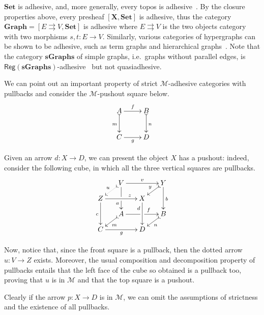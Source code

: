 \documentclass[runningheads,envcountsect]{lipics-v2021}
\newcommand{\cat}[1]{\ensuremath{\mathbf{#1}}}
\def\C{\textbf {\textup{C}}}
\newcommand{\reg}{\mathsf{Reg}}
\begin{document}
\begin{example}
	\label{ex:adhesive}
	$\cat{Set}$ is adhesive, and, more generally, every topos is
	adhesive~\cite{lack2006toposes}. By the closure properties above, every presheaf $[\cat{X},\cat{Set}]$ is adhesive, thus the category
	$\cat{Graph} = [ E \rightrightarrows V, \cat{Set}]$ is adhesive
	where $E \rightrightarrows {V}$ is the two objects category with two
	morphisms $s,t \colon{E} \to {V}$. Similarly, various
	categories of hypergraphs can be shown to be adhesive, such as term
	graphs and hierarchical graphs~\cite{CastelnovoGM24}. Note that the category $\cat{sGraphs}$ of simple graphs, 
	i.e.~graphs without parallel edges, is
	$\reg{(\cat{sGraphs})}$-adhesive~\cite{BehrHK23} but not
	quasiadhesive.
\end{example}


\begin{remark}\label{rem:deco}
	We can point out an important property of strict $\mathcal{M}$-adhesive categories with pullbacks and consider the $\mathcal{M}$-pushout square below.
	\[\xymatrix{A \ar[r]^{f} \ar@{>->}[d]_{m}& B \ar@{>->}[d]^{n}\\ C \ar[r]_{g} & D}\]
	
	Given an arrow $d\colon X\to D$, we can present the object $X$ has a pushout: indeed, consider the following cube, in which all the three vertical squares are pullbacks.
	\[
	\xymatrix@C=15pt@R=9pt{&V\ar[dd]|\hole_(.65){a}\ar[rr]^{v} \ar@{>.>}[dl]_{u} && Y \ar[dd]^{b} \ar@{>->}[dl]_{y} \\ Z  \ar[dd]_{c}\ar[rr]^(.7){z} & & X \ar[dd]_(.3){d}\\&A\ar[rr]|\hole^(.65){f} \ar@{>->}[dl]^{m} && B \ar@{>->}[dl]^{n} \\C \ar[rr]_{g} & & D }\]

Now, notice that, since the front square is a pullback, then the dotted arrow $u\colon V\to Z$ exists. Moreover, the usual composition and decomposition property of pullbacks \cite{mac2013categories} entails that the left face of the cube so obtained is a pullback too, proving that $u$ is in $\mathcal{M}$ and that the top square is a pushout.

	Clearly if the arrow $p\colon X\to D$ is in $\mathcal{M}$, we can omit the assumptions of strictness and the existence of all pullbacks.
\end{remark}
\end{document}
